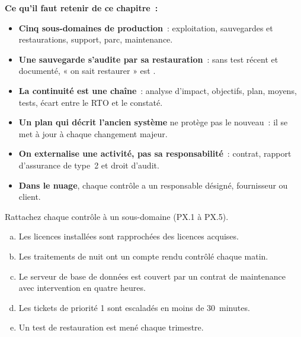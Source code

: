 \begin{boxresume}
\textbf{Ce qu'il faut retenir de ce chapitre~:}
\begin{itemize}
    \item \textbf{Cinq sous-domaines de production}~: exploitation,
          sauvegardes et restaurations, support, parc, maintenance.
    \item \textbf{Une sauvegarde s'audite par sa restauration}~: sans test
          récent et documenté, « on sait restaurer » est \NEK{}.
    \item \textbf{La continuité est une chaîne}~: analyse d'impact,
          objectifs, plan, moyens, tests, écart entre le RTO et le
          constaté.
    \item \textbf{Un plan qui décrit l'ancien système} ne protège pas le
          nouveau~: il se met à jour à chaque changement majeur.
    \item \textbf{On externalise une activité, pas sa responsabilité}~:
          contrat, rapport d'assurance de type~2 et droit d'audit.
    \item \textbf{Dans le nuage}, chaque contrôle a un responsable
          désigné, fournisseur ou client.
\end{itemize}
\end{boxresume}

\bigskip

\begin{boxexo}[title={\ding{45}\quad Exercice~17.1. Rattacher les contrôles \niveaubase}]
Rattachez chaque contrôle à un sous-domaine (PX.1 à PX.5).
\begin{enumerate}[(a)]
    \item Les licences installées sont rapprochées des licences acquises.
    \item Les traitements de nuit ont un compte rendu contrôlé chaque matin.
    \item Le serveur de base de données est couvert par un contrat de
          maintenance avec intervention en quatre heures.
    \item Les tickets de priorité 1 sont escaladés en moins de 30~minutes.
    \item Un test de restauration est mené chaque trimestre.
\end{enumerate}
\end{boxexo}


